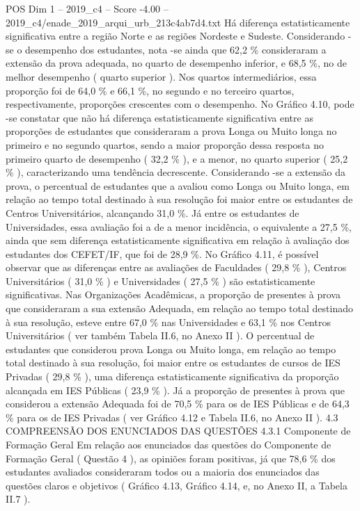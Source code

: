 \begin{textsample}{POS Dim 1 – 2019\_c4 – Score -4.00 – 2019\_c4/enade\_2019\_arqui\_urb\_213c4ab7d4.txt}
Há diferença estatisticamente significativa entre a região Norte e as regiões Nordeste e Sudeste.
Considerando -se o desempenho dos estudantes, nota -se ainda que 62,2 \% consideraram a extensão da prova adequada, no quarto de desempenho inferior, e 68,5 \%, no de melhor desempenho ( quarto superior ).
Nos quartos intermediários, essa proporção foi de 64,0 \% e 66,1 \%, no segundo e no terceiro quartos, respectivamente, proporções crescentes com o desempenho.
No Gráfico 4.10, pode -se constatar que não há diferença estatisticamente significativa entre as proporções de estudantes que consideraram a prova Longa ou Muito longa no primeiro e no segundo quartos, sendo a maior proporção dessa resposta no primeiro quarto de desempenho ( 32,2 \% ), e a menor, no quarto superior ( 25,2 \% ), caracterizando uma tendência decrescente.
Considerando -se a extensão da prova, o percentual de estudantes que a avaliou como Longa ou Muito longa, em relação ao tempo total destinado à sua resolução foi maior entre os estudantes de Centros Universitários, alcançando 31,0 \%.
Já entre os estudantes de Universidades, essa avaliação foi a de a menor incidência, o equivalente a 27,5 \%, ainda que sem diferença estatisticamente significativa em relação à avaliação dos estudantes dos CEFET/IF, que foi de 28,9 \%.
No Gráfico 4.11, é possível observar que as diferenças entre as avaliações de Faculdades ( 29,8 \% ), Centros Universitários ( 31,0 \% ) e Universidades ( 27,5 \% ) são estatisticamente significativas.
Nas Organizações Acadêmicas, a proporção de presentes à prova que consideraram a sua extensão Adequada, em relação ao tempo total destinado à sua resolução, esteve entre 67,0 \% nas Universidades e 63,1 \% nos Centros Universitários ( ver também Tabela II.6, no Anexo II ).
O percentual de estudantes que considerou prova Longa ou Muito longa, em relação ao tempo total destinado à sua resolução, foi maior entre os estudantes de cursos de IES Privadas ( 29,8 \% ), uma diferença estatisticamente significativa da proporção alcançada em IES Públicas ( 23,9 \% ).
Já a proporção de presentes à prova que considerou a extensão Adequada foi de 70,5 \% para os de IES Públicas e de 64,3 \% para os de IES Privadas ( ver Gráfico 4.12 e Tabela II.6, no Anexo II ). 4.3 COMPREENSÃO DOS ENUNCIADOS DAS QUESTÕES 4.3.1 Componente de Formação Geral Em relação aos enunciados das questões do Componente de Formação Geral ( Questão 4 ), as opiniões foram positivas, já que 78,6 \% dos estudantes avaliados consideraram todos ou a maioria dos enunciados das questões claros e objetivos ( Gráfico 4.13, Gráfico 4.14, e, no Anexo II, a Tabela II.7 ).

\end{textsample}
